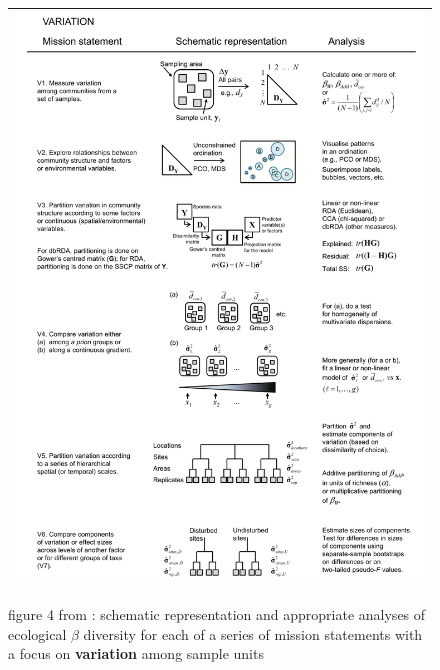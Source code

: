 \documentclass[references.tex]{subfiles}
\begin{document}
\begin{figure}[h!]
    \centering
    \begin{tabular}{c}
    \includegraphics[scale=0.65]{images/figures/AndCri2011/fig4.png}
    \\\hline
    \end{tabular}
    \caption{
        figure 4 from \citep{AndCri2011}: schematic representation and appropriate analyses of ecological $\beta$ diversity for each of a series of mission statements with a focus on \textbf{variation} among sample units
    }
\end{figure}



\bib{}
\end{document}
